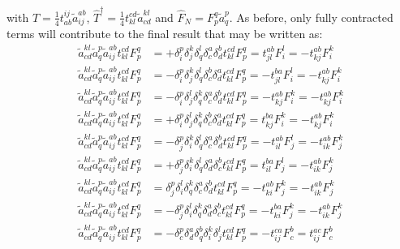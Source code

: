 \documentclass[journal=jacsat]{achemso}
\numberwithin{equation}{section}
\begin{document}
with $\hat{T}=\frac{1}{4}t^{ij}_{ab}\tilde{a}^{ab}_{ij}$, $\hat{T}^{\dagger}=\frac{1}{4}t^{cd}_{kl}\tilde{a}^{kl}_{cd}$ and $\hat{F}_{N}=F^{q}_{p}\tilde{a}^{p}_{q}$. As before, only fully contracted terms will contribute to the final result that may be written as:
\begin{align}
\tilde{a}^{kl}_{cd}\tilde{a}^{p}_{q}\tilde{a}^{ab}_{ij}t^{cd}_{kl}F^{q}_{p}&= +\delta^{p}_{i}\delta^{k}_{j}\delta^{l}_{q}\delta^{a}_{c}\delta^{b}_{d}t^{cd}_{kl}F^{q}_{p}=t^{ab}_{jl}F^{l}_{i}=-t^{ab}_{kj}F^{k}_{i}\\
\tilde{a}^{kl}_{cd}\tilde{a}^{p}_{q}\tilde{a}^{ab}_{ij}t^{cd}_{kl}F^{q}_{p}&= -\delta^{p}_{i}\delta^{k}_{j}\delta^{l}_{q}\delta^{b}_{c}\delta^{a}_{d}t^{cd}_{kl}F^{q}_{p}=-t^{ba}_{jl}F^{l}_{i}=-t^{ab}_{kj}F^{k}_{i}\\
\tilde{a}^{kl}_{cd}\tilde{a}^{p}_{q}\tilde{a}^{ab}_{ij}t^{cd}_{kl}F^{q}_{p}&= -\delta^{p}_{i}\delta^{l}_{j}\delta^{k}_{q}\delta^{a}_{c}\delta^{b}_{d}t^{cd}_{kl}F^{q}_{p}=-t^{ab}_{kj}F^{k}_{i}=-t^{ab}_{kj}F^{k}_{i}\\
\tilde{a}^{kl}_{cd}\tilde{a}^{p}_{q}\tilde{a}^{ab}_{ij}t^{cd}_{kl}F^{q}_{p}&= +\delta^{p}_{i}\delta^{l}_{j}\delta^{k}_{q}\delta^{b}_{c}\delta^{a}_{d}t^{cd}_{kl}F^{q}_{p}=t^{ba}_{kj}F^{k}_{i}=-t^{ab}_{kj}F^{k}_{i}\\
\tilde{a}^{kl}_{cd}\tilde{a}^{p}_{q}\tilde{a}^{ab}_{ij}t^{cd}_{kl}F^{q}_{p}&= -\delta^{p}_{j}\delta^{k}_{i}\delta^{l}_{q}\delta^{a}_{c}\delta^{b}_{d}t^{cd}_{kl}F^{q}_{p}=-t^{ab}_{il}F^{l}_{j}=-t^{ab}_{ik}F^{k}_{j}\\
\tilde{a}^{kl}_{cd}\tilde{a}^{p}_{q}\tilde{a}^{ab}_{ij}t^{cd}_{kl}F^{q}_{p}&=+ \delta^{p}_{j}\delta^{k}_{i}\delta^{l}_{q}\delta^{a}_{d}\delta^{b}_{c}t^{cd}_{kl}F^{q}_{p}=t^{ba}_{il}F^{l}_{j}=-t^{ab}_{ik}F^{k}_{j}\\
\tilde{a}^{kl}_{cd}\tilde{a}^{p}_{q}\tilde{a}^{ab}_{ij}t^{cd}_{kl}F^{q}_{p}&= \delta^{p}_{j}\delta^{l}_{i}\delta^{k}_{q}\delta^{a}_{c}\delta^{b}_{d}t^{cd}_{kl}F^{q}_{p}=-t^{ab}_{ki}F^{k}_{j}=-t^{ab}_{ik}F^{k}_{j}\\
\tilde{a}^{kl}_{cd}\tilde{a}^{p}_{q}\tilde{a}^{ab}_{ij}t^{cd}_{kl}F^{q}_{p}&=- \delta^{p}_{j}\delta^{l}_{i}\delta^{k}_{q}\delta^{a}_{d}\delta^{b}_{c}t^{cd}_{kl}F^{q}_{p}=-t^{ba}_{ki}F^{k}_{j}=-t^{ab}_{ik}F^{k}_{j}\\
\tilde{a}^{kl}_{cd}\tilde{a}^{p}_{q}\tilde{a}^{ab}_{ij}t^{cd}_{kl}F^{q}_{p}&=- \delta^{p}_{c}\delta^{a}_{d}\delta^{b}_{q}\delta^{k}_{i}\delta^{l}_{j}t^{cd}_{kl}F^{q}_{p}=-t^{ca}_{ij}F^{b}_{c}=t^{ac}_{ij}F^{b}_{c}\\

\end{align}
\end{document}
